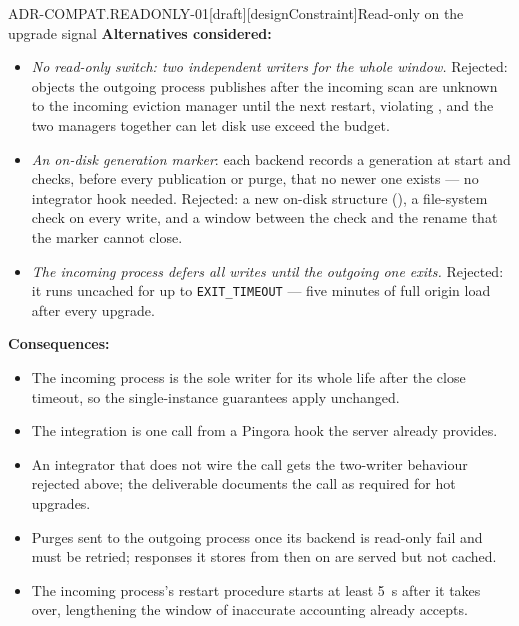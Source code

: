 \begin{requirement}{ADR-COMPAT.READONLY-01}[draft][designConstraint]{Read-only on the upgrade signal}
  \textbf{Alternatives considered:}
  \begin{itemize}
    \item \emph{No read-only switch: two independent writers for the whole
      window.}
      Rejected: objects the outgoing process publishes after the incoming
      scan are unknown to the incoming eviction manager until the next
      restart, violating , and the two
      managers together can let disk use exceed the budget.
    \item \emph{An on-disk generation marker}: each backend records a
      generation at start and checks, before every publication or purge, that
      no newer one exists --- no integrator hook needed. Rejected: a new
      on-disk structure (), a file-system check on
      every write, and a window between the check and the rename that the
      marker cannot close.
    \item \emph{The incoming process defers all writes until the outgoing one
      exits.} Rejected: it runs uncached for up to \texttt{EXIT\_TIMEOUT} ---
      five minutes of full origin load after every upgrade.
  \end{itemize}

  \textbf{Consequences:}
  \begin{itemize}
    \item[+] The incoming process is the sole writer for its whole life after
      the close timeout, so the single-instance guarantees apply unchanged.
    \item[+] The integration is one call from a Pingora hook the server
      already provides.
    \item[--] An integrator that does not wire the call gets the two-writer
      behaviour rejected above; the deliverable documents the call as
      required for hot upgrades.
    \item[--] Purges sent to the outgoing process once its backend is
      read-only fail and must be retried; responses it stores from then on
      are served but not cached.
    \item[--] The incoming process's restart procedure starts at least 5~s
      after it takes over, lengthening the window of inaccurate accounting
       already accepts.
  \end{itemize}



\end{requirement}

